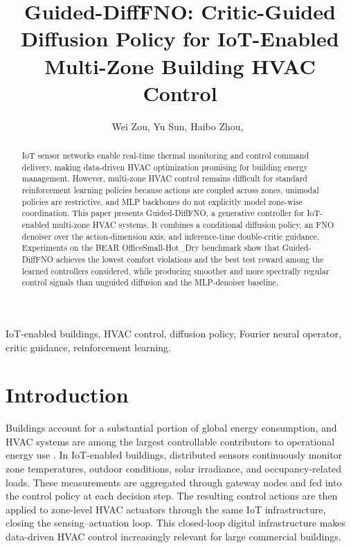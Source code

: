 \documentclass[conference]{IEEEtran}
\theoremstyle{nonumberplain}
\theoremstyle{plain}
\begin{document}
\title{Guided-DiffFNO: Critic-Guided Diffusion Policy for IoT-Enabled Multi-Zone Building HVAC Control}

\author{Wei Zou, Yu Sun, Haibo Zhou,~}

\maketitle

\begin{abstract}
IoT sensor networks enable real-time thermal monitoring and control command delivery, making data-driven HVAC optimization promising for building energy management. However, multi-zone HVAC control remains difficult for standard reinforcement learning policies because actions are coupled across zones, unimodal policies are restrictive, and MLP backbones do not explicitly model zone-wise coordination. This paper presents Guided-DiffFNO, a generative controller for IoT-enabled multi-zone HVAC systems. It combines a conditional diffusion policy, an FNO denoiser over the action-dimension axis, and inference-time double-critic guidance. Experiments on the BEAR OfficeSmall-Hot\_Dry benchmark show that Guided-DiffFNO achieves the lowest comfort violations and the best test reward among the learned controllers considered, while producing smoother and more spectrally regular control signals than unguided diffusion and the MLP-denoiser baseline.
\end{abstract}

\begin{IEEEkeywords}
IoT-enabled buildings, HVAC control, diffusion policy, Fourier neural operator, critic guidance, reinforcement learning.
\end{IEEEkeywords}

\section{Introduction}

Buildings account for a substantial portion of global energy consumption, and HVAC systems are among the largest controllable contributors to operational energy use \cite{perez2008review,cao2016building,cuce2026role}. In IoT-enabled buildings, distributed sensors continuously monitor zone temperatures, outdoor conditions, solar irradiance, and occupancy-related loads. These measurements are aggregated through gateway nodes and fed into the control policy at each decision step. The resulting control actions are then applied to zone-level HVAC actuators through the same IoT infrastructure, closing the sensing--actuation loop. This closed-loop digital infrastructure makes data-driven HVAC control increasingly relevant for large commercial buildings.
\end{document}
